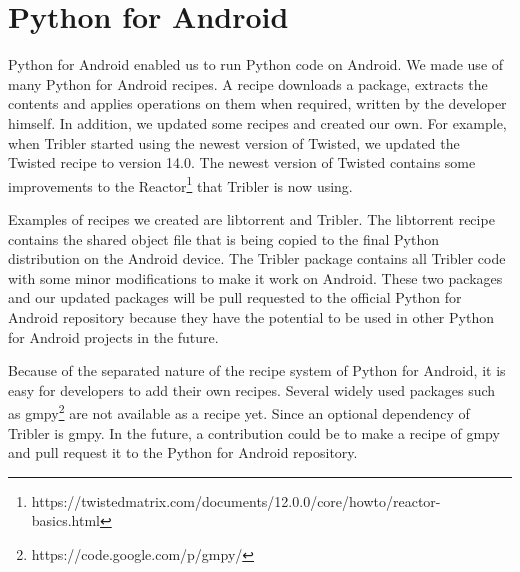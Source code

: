 \section{Python for Android}
\label{sec:pythonforandroid}
	Python for Android enabled us to run Python code on Android. We made use of many Python for Android recipes. A recipe downloads a package, extracts the contents and applies operations on them when required, written by the developer himself. In addition, we updated some recipes and created our own. For example, when Tribler started using the newest version of Twisted, we updated the Twisted recipe to version 14.0. The newest version of Twisted contains some improvements to the Reactor\footnote{https://twistedmatrix.com/documents/12.0.0/core/howto/reactor-basics.html} that Tribler is now using.
	
	Examples of recipes we created are libtorrent and Tribler. The libtorrent recipe contains the shared object file that is being copied to the final Python distribution on the Android device. The Tribler package contains all Tribler code with some minor modifications to make it work on Android. These two packages and our updated packages will be pull requested to the official Python for Android repository because they have the potential to be used in other Python for Android projects in the future.
	
	Because of the separated nature of the recipe system of Python for Android, it is easy for developers to add their own recipes. Several widely used packages such as gmpy\footnote{https://code.google.com/p/gmpy/} are not available as a recipe yet. Since an optional dependency of Tribler is gmpy. In the future, a contribution could be to make a recipe of gmpy and pull request it to the Python for Android repository.
